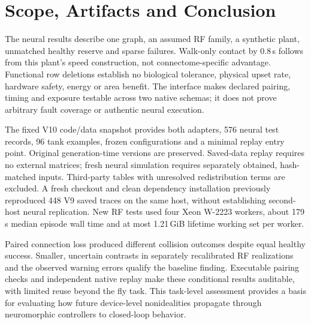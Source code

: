 \section{Scope, Artifacts and Conclusion}
The neural results describe one graph, an assumed RF family, a synthetic plant, unmatched healthy reserve and sparse failures. Walk-only contact by 0.8\,s follows from this plant's speed construction, not connectome-specific advantage. Functional row deletions establish no biological tolerance, physical upset rate, hardware safety, energy or area benefit. The interface makes declared pairing, timing and exposure testable across two native schemas; it does not prove arbitrary fault coverage or authentic neural execution.

The fixed V10 code/data snapshot\cite{artifactV10} provides both adapters, 576 neural test records, 96 tank examples, frozen configurations and a minimal replay entry point. Original generation-time versions are preserved. Saved-data replay requires no external matrices; fresh neural simulation requires separately obtained, hash-matched inputs. Third-party tables with unresolved redistribution terms are excluded. A fresh checkout and clean dependency installation previously reproduced 448 V9 saved traces on the same host, without establishing second-host neural replication. New RF tests used four Xeon W-2223 workers, about 179\,s median episode wall time and at most 1.21\,GiB lifetime working set per worker.

Paired connection loss produced different collision outcomes despite equal healthy success. Smaller, uncertain contrasts in separately recalibrated RF realizations and the observed warning errors qualify the baseline finding. Executable pairing checks and independent native replay make these conditional results auditable, with limited reuse beyond the fly task. This task-level assessment provides a basis for evaluating how future device-level nonidealities propagate through neuromorphic controllers to closed-loop behavior.
